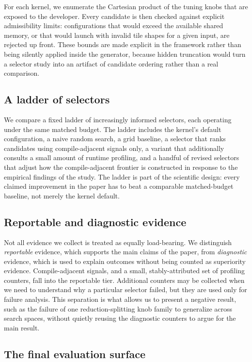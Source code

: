 For each kernel, we enumerate the Cartesian product of the tuning knobs that are exposed to the developer. Every candidate is then checked against explicit admissibility limits: configurations that would exceed the available shared memory, or that would launch with invalid tile shapes for a given input, are rejected up front. These bounds are made explicit in the framework rather than being silently applied inside the generator, because hidden truncation would turn a selector study into an artifact of candidate ordering rather than a real comparison.

\subsection{A ladder of selectors}

We compare a fixed ladder of increasingly informed selectors, each operating under the same matched budget. The ladder includes the kernel's default configuration, a naive random search, a grid baseline, a selector that ranks candidates using compile-adjacent signals only, a variant that additionally consults a small amount of runtime profiling, and a handful of revised selectors that adjust how the compile-adjacent frontier is constructed in response to the empirical findings of the study. The ladder is part of the scientific design: every claimed improvement in the paper has to beat a comparable matched-budget baseline, not merely the kernel default.

\subsection{Reportable and diagnostic evidence}

Not all evidence we collect is treated as equally load-bearing. We distinguish \emph{reportable} evidence, which supports the main claims of the paper, from \emph{diagnostic} evidence, which is used to explain outcomes without being counted as superiority evidence. Compile-adjacent signals, and a small, stably-attributed set of profiling counters, fall into the reportable tier. Additional counters may be collected when we need to understand why a particular selector failed, but they are used only for failure analysis. This separation is what allows us to present a negative result, such as the failure of one reduction-splitting knob family to generalize across search spaces, without quietly reusing the diagnostic counters to argue for the main result.

\subsection{The final evaluation surface}

